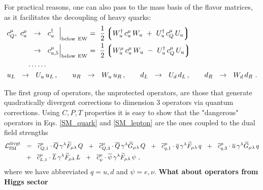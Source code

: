 \documentclass[12pt,preprintnumbers,nofootinbib]{revtex4}
\newcommand{\wt}{\widetilde}
\newcommand{\ov}{\overline}
\begin{document}
	For practical reasons, one can also pass to the mass basis of the 
	flavor matrices, as it facilitates the decoupling of heavy quarks:
\begin{align}
\label{gauge_mass_basis}
\notag
	c_Q^\mu,\  c_u^\mu  & ~~\rightarrow~~ c_{u\phantom{,5}}^\dag 
				\Bigl|_{\rm below\ EW}  ~=~ \frac{1}{2} 
			\left\lgroup W^\dag_u\, c_u^\mu\, W_u ~+~ U_u^\dag\, c_Q^\mu\, U_u 
						\right\rgroup
	\\
	&
	~~\rightarrow~~ c_{u,5}^\mu 
			\Bigl|_{\rm below\ EW}  ~=~ \frac{1}{2} 
			\left\lgroup W^\mu_u\, c_u^\mu\, W_u ~-~ U_u^\dag\, c_Q^\mu\, U_u 
						\right\rgroup
	\\
\notag
	& \dots\dots
	\\
\notag
	& 
	\hspace{-1.0cm}
	u_L ~~\rightarrow~~ U_u\, u_L\,,   \qquad u_R ~~\rightarrow~~ W_u\, u_R\,, \qquad 
	d_L ~~\rightarrow~~ U_d\, d_L\,,   \qquad d_R ~~\rightarrow~~ W_d\, d_R~.
\end{align}


    The first group of operators, the unprotected operators, are those that generate
    quadratically divergent corrections to dimension 3 operators via quantum corrections. 
	Using $C,P,T$ properties it is easy to show that the "dangerous" operators
	in Eqs. \eqref{SM_quark} and \eqref{SM_lepton} are the ones coupled to
	the dual field strengths
\begin{align}
\label{SM_divgt}
\notag
	\mathcal{L}_{\rm SM}^{\rm divgt} & ~~=~~
	\wt{c}_{Q,1}^\mu \cdot
	\ov{Q}\, \gamma^\lambda \wt{F}_{\mu\lambda}\, Q 
	~~+~~
	\wt{c}_{Q,3}^\mu \cdot
	\ov{Q}\, \gamma^\lambda \wt{G}_{\mu\lambda}\, Q 
	~~+~~
	\wt{c}_{q,1}^\mu \cdot
	\ov{q}\, \gamma^\lambda \wt{F}_{\mu\lambda}\, q
	~~+~~ 
	\wt{c}_{q,3}^\mu \cdot
	\ov{u}\, \gamma^\lambda \wt{G}_{\mu\lambda}\, q
	\\
	&
	~~+~~ 
	\wt{c}_{L,1}^\mu \cdot
	\ov{L}\, \gamma^{\lambda} \wt{F}_{\mu\lambda}\, L
	~~+~~
	\wt{c}_{\psi}^\mu \cdot
	\ov{\psi}\, \gamma^{\lambda} \wt{F}_{\mu\lambda}\, \psi
	~,
\end{align}
	where we have abbreviated $ q = u, d $ and $ \psi = e, \nu $.
	{\bf What about operators from Higgs sector}
	
\end{document}
